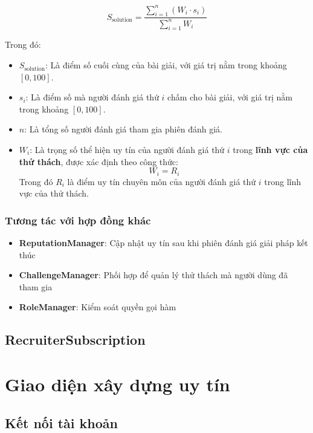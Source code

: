 \[
S_{\text{solution}}= \frac{\displaystyle\sum_{i=1}^{n} (W_{i} \cdot s_{i})}{\displaystyle\sum_{i=1}^{n} W_{i}}
\]

Trong đó:

\begin{itemize}
  \item $S_{\text{solution}}$: Là điểm số cuối cùng của bài giải, với giá trị nằm trong khoảng $[0, 100]$.
  \item $s_{i}$: Là điểm số mà người đánh giá thứ $i$ chấm cho bài giải, với giá trị nằm trong khoảng $[0, 100]$.
  \item $n$: Là tổng số người đánh giá tham gia phiên đánh giá.
  \item $W_{i}$: Là trọng số thể hiện uy tín của người đánh giá thứ $i$ trong \textbf{lĩnh vực của thử thách}, được xác định theo công thức:
  \[
  W_{i} = R_{i}
  \]
  Trong đó $R_{i}$ là điểm uy tín chuyên môn của người đánh giá thứ $i$ trong lĩnh vực của thử thách.
\end{itemize}



\subsubsection{Tương tác với hợp đồng khác}

\begin{itemize}
  \item \textbf{ReputationManager}: Cập nhật uy tín sau khi phiên đánh giá giải pháp kết thúc
  \item \textbf{ChallengeManager}: Phối hợp để quản lý thử thách mà người dùng đã tham gia
  \item \textbf{RoleManager}: Kiểm soát quyền gọi hàm
\end{itemize}

\subsection{RecruiterSubscription}

\section{Giao diện xây dựng uy tín}

\subsection{Kết nối tài khoản}


